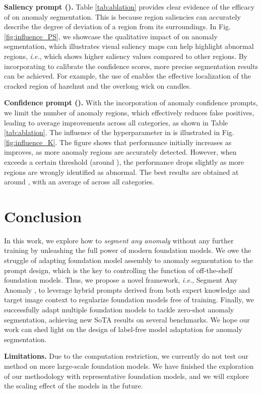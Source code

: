 \documentclass{article}
\begin{document}
\noindent\textbf{Saliency prompt ().} Table \ref{tab:ablation} provides clear evidence of the efficacy of  on anomaly segmentation. This is because region saliencies can accurately describe the degree of deviation of a region from its surroundings. In Fig. \ref{fig:influence_PS}, we showcase the qualitative impact of  on anomaly segmentation, which illustrates visual saliency maps can help highlight abnormal regions, \textit{i.e.}, which shows higher saliency values compared to other regions. By incorporating  to calibrate the confidence scores, more precise segmentation results can be achieved. For example, the use of  enables the effective localization of the cracked region of hazelnut and the overlong wick on candles. 

\noindent\textbf{Confidence prompt ().} 
 With the incorporation of anomaly confidence prompts, we limit the number of anomaly regions, which effectively reduces false positives, leading to   average improvements across all categories, as shown in Table \ref{tab:ablation}.
The influence of the hyperparameter  in  is illustrated in Fig. \ref{fig:influence_K}. The figure shows that performance initially increases as  improves, as more anomaly regions are accurately detected. However, when  exceeds a certain threshold (around ), the performance drops slightly as more regions are wrongly identified as abnormal. The best results are obtained at around , with an average  of   across all categories.

\section{Conclusion}

In this work, we explore how to \textit{segment any anomaly} without any further training by unleashing the full power of modern foundation models. We owe the struggle of adapting foundation model assembly to anomaly segmentation to the prompt design, which is the key to controlling the function of off-the-shelf foundation models. Thus, we propose a novel framework, \textit{i.e.}, Segment Any Anomaly , to leverage hybrid prompts derived from both expert knowledge and target image context to regularize foundation models free of training. Finally, we successfully adapt multiple foundation models to tackle zero-shot anomaly segmentation, achieving new SoTA results on several benchmarks. We hope our work can shed light on the design of label-free model adaptation for anomaly segmentation.

\textbf{Limitations.} Due to the computation restriction, we currently do not test our method on more large-scale foundation models. We have finished the exploration of our methodology with representative foundation models, and we will explore the scaling effect of the models in the future.
\end{document}
